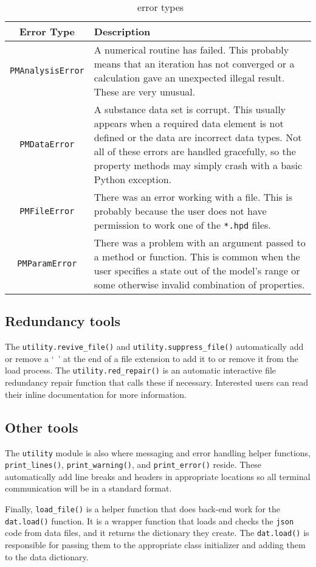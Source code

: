 \begin{table}
\caption{\PM\ error types}\label{tab:errors}
\begin{tabular}{|cp{2.5in}|}
\hline
Error Type & Description\\
\hline
\texttt{PMAnalysisError} & A numerical routine has failed. This probably means that an iteration has not converged or a calculation gave an unexpected illegal result.  These are very unusual.\\
\texttt{PMDataError} & A substance data set is corrupt. This usually appears when a required data element is not defined or the data are incorrect data types.  Not all of these errors are handled gracefully, so the property methods may simply crash with a basic Python exception.\\
\texttt{PMFileError} & There was an error working with a file. This is probably because the user does not have permission to work one of the \texttt{*.hpd} files.\\
\texttt{PMParamError} & There was a problem with an argument passed to a method or function. This is common when the user specifies a state out of the model's range or some otherwise invalid combination of properties.\\
\hline
\end{tabular}
\end{table}

\subsection{Redundancy tools}

The \verb|utility.revive_file()| and \verb|utility.suppress_file()| automatically add or remove a `~' at the end of a file extension to add it to or remove it from the load process.  The \verb|utility.red_repair()| is an automatic interactive file redundancy repair function that calls these if necessary.  Interested users can read their inline documentation for more information.

\subsection{Other tools}

The \verb|utility| module is also where messaging and error handling helper functions, \verb|print_lines()|, \verb|print_warning()|, and \verb|print_error()| reside.  These automatically add line breaks and headers in appropriate locations so all terminal communication will be in a standard format.

Finally, \verb|load_file()| is a helper function that does back-end work for the \verb|dat.load()| function.  It is a wrapper function that loads and checks the \verb|json| code from data files, and it returns the dictionary they create.  The \verb|dat.load()| is responsible for passing them to the appropriate class initializer and adding them to the data dictionary.
